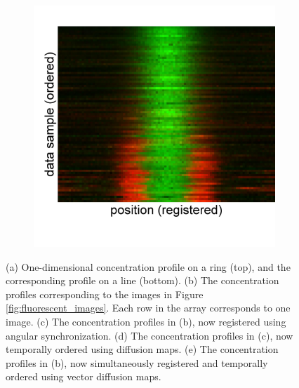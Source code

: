 \documentclass{pnastwo}
\begin{document}
\begin{figure}
\begin{subfigure}{0.2\textwidth}
\caption{}
\label{subfig:1d_aligned_ordered}
\end{subfigure}
\begin{subfigure}{0.2\textwidth}
\includegraphics[width=\textwidth]{registered_ordered_vdm_1d}
\caption{}
\label{subfig:1d_aligned_ordered_vdm}
\end{subfigure}
\caption{(a) One-dimensional concentration profile on a ring (top), and the corresponding profile on a line (bottom). (b) The concentration profiles corresponding to the images in Figure \ref{fig:fluorescent_images}. Each row in the array corresponds to one image. (c) The concentration profiles in (b), now registered using angular synchronization. (d) The concentration profiles in (c), now temporally ordered using diffusion maps. (e) The concentration profiles in (b), now simultaneously registered and temporally ordered using vector diffusion maps. }
\label{fig:1d_demo}
\end{figure}
\end{document}
